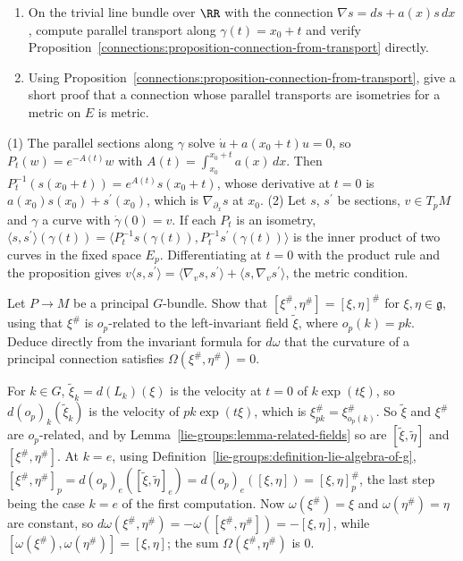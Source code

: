 \begin{exercise}\label{connections:exercise-connection-from-transport}
\begin{enumerate}
\item On the trivial line bundle over $\RR$ with the connection $\nabla s = ds + a(x)s\,dx$, compute parallel transport along $\gamma(t) = x_0 + t$ and verify
Proposition~\ref{connections:proposition-connection-from-transport} directly.
\item Using Proposition~\ref{connections:proposition-connection-from-transport}, give a short proof that a connection whose parallel transports are isometries for a metric on $E$ is metric.
\end{enumerate}
\end{exercise}

\begin{solution}
(1) The parallel sections along $\gamma$ solve $\dot u + a(x_0 + t)u = 0$, so $P_t(w) = e^{-A(t)}w$ with $A(t) = \int_{x_0}^{x_0+t}a(x)\,dx$. Then $P_t^{-1}(s(x_0 + t)) = e^{A(t)}s(x_0 + t)$, whose derivative at
$t = 0$ is $a(x_0)s(x_0) + s^{\prime}(x_0)$, which is $\nabla_{\partial_x}s$ at $x_0$. (2) Let $s$, $s^{\prime}$ be sections, $v \in T_pM$ and $\gamma$ a curve with $\dot\gamma(0) = v$. If each $P_t$ is an isometry,
$\langle s, s^{\prime}\rangle(\gamma(t)) = \langle P_t^{-1}s(\gamma(t)), P_t^{-1}s^{\prime}(\gamma(t))\rangle$ is the inner product of two curves in the fixed space $E_p$. Differentiating at $t = 0$ with the product rule
and the proposition gives $v\langle s, s^{\prime}\rangle = \langle\nabla_vs, s^{\prime}\rangle + \langle s, \nabla_vs^{\prime}\rangle$, the metric condition.
\end{solution}

\begin{exercise}\label{connections:exercise-fundamental-bracket}
Let $P \to M$ be a principal $G$-bundle. Show that $[\xi^\#, \eta^\#] = [\xi, \eta]^\#$ for $\xi, \eta \in \mathfrak{g}$, using that $\xi^\#$ is $o_p$-related to the left-invariant field $\widetilde{\xi}$, where
$o_p(k) = pk$. Deduce directly from the invariant formula for $d\omega$ that the curvature of a principal connection satisfies $\Omega(\xi^\#, \eta^\#) = 0$.
\end{exercise}

\begin{solution}
For $k \in G$, $\widetilde{\xi}_k = d(L_k)(\xi)$ is the velocity at $t = 0$ of $k\exp(t\xi)$, so $d(o_p)_k(\widetilde{\xi}_k)$ is the velocity of $pk\exp(t\xi)$, which is $\xi^\#_{pk} = \xi^\#_{o_p(k)}$. So
$\widetilde{\xi}$ and $\xi^\#$ are $o_p$-related, and by Lemma~\ref{lie-groups:lemma-related-fields} so are $[\widetilde{\xi}, \widetilde{\eta}]$ and $[\xi^\#, \eta^\#]$. At $k = e$, using
Definition~\ref{lie-groups:definition-lie-algebra-of-g}, $[\xi^\#, \eta^\#]_p = d(o_p)_e([\widetilde{\xi}, \widetilde{\eta}]_e) = d(o_p)_e([\xi, \eta]) = [\xi, \eta]^\#_p$, the last step being the case
$k = e$ of the first computation. Now $\omega(\xi^\#) = \xi$ and $\omega(\eta^\#) = \eta$ are constant, so $d\omega(\xi^\#, \eta^\#) = -\omega([\xi^\#, \eta^\#]) = -[\xi, \eta]$, while
$[\omega(\xi^\#), \omega(\eta^\#)] = [\xi, \eta]$; the sum $\Omega(\xi^\#, \eta^\#)$ is $0$.
\end{solution}

